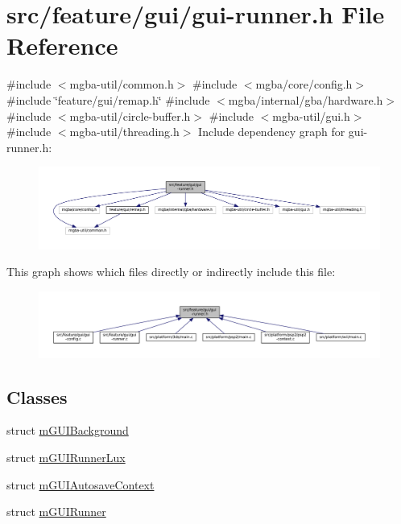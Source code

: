 \hypertarget{gui-runner_8h}{}\section{src/feature/gui/gui-\/runner.h File Reference}
\label{gui-runner_8h}
{\ttfamily \#include $<$mgba-\/util/common.\+h$>$}\newline
{\ttfamily \#include $<$mgba/core/config.\+h$>$}\newline
{\ttfamily \#include \char`\"{}feature/gui/remap.\+h\char`\"{}}\newline
{\ttfamily \#include $<$mgba/internal/gba/hardware.\+h$>$}\newline
{\ttfamily \#include $<$mgba-\/util/circle-\/buffer.\+h$>$}\newline
{\ttfamily \#include $<$mgba-\/util/gui.\+h$>$}\newline
{\ttfamily \#include $<$mgba-\/util/threading.\+h$>$}\newline
Include dependency graph for gui-\/runner.h\+:
\nopagebreak
\begin{figure}[H]
\begin{center}
\leavevmode
\includegraphics[width=350pt]{gui-runner_8h__incl}
\end{center}
\end{figure}
This graph shows which files directly or indirectly include this file\+:
\nopagebreak
\begin{figure}[H]
\begin{center}
\leavevmode
\includegraphics[width=350pt]{gui-runner_8h__dep__incl}
\end{center}
\end{figure}
\subsection*{Classes}
\begin{DoxyCompactItemize}
\item 
struct \mbox{\hyperlink{gui-runner_8h_structm_g_u_i_background}{m\+G\+U\+I\+Background}}
\item 
struct \mbox{\hyperlink{gui-runner_8h_structm_g_u_i_runner_lux}{m\+G\+U\+I\+Runner\+Lux}}
\item 
struct \mbox{\hyperlink{gui-runner_8h_structm_g_u_i_autosave_context}{m\+G\+U\+I\+Autosave\+Context}}
\item 
struct \mbox{\hyperlink{structm_g_u_i_runner}{m\+G\+U\+I\+Runner}}
\end{DoxyCompactItemize}
